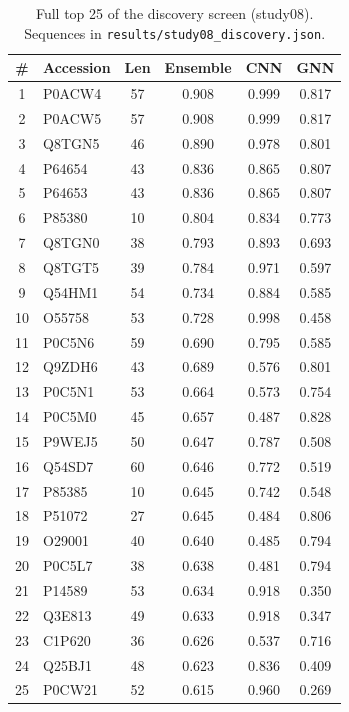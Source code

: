 \begin{table}[h]\centering\caption{Full top 25 of the discovery screen (study08). Sequences in \texttt{results/study08\_discovery.json}.}\label{tab:allscreen}
\small\begin{tabular}{clcccc}\hline \# & Accession & Len & Ensemble & CNN & GNN \\ \hline
1 & P0ACW4 & 57 & 0.908 & 0.999 & 0.817 \\
2 & P0ACW5 & 57 & 0.908 & 0.999 & 0.817 \\
3 & Q8TGN5 & 46 & 0.890 & 0.978 & 0.801 \\
4 & P64654 & 43 & 0.836 & 0.865 & 0.807 \\
5 & P64653 & 43 & 0.836 & 0.865 & 0.807 \\
6 & P85380 & 10 & 0.804 & 0.834 & 0.773 \\
7 & Q8TGN0 & 38 & 0.793 & 0.893 & 0.693 \\
8 & Q8TGT5 & 39 & 0.784 & 0.971 & 0.597 \\
9 & Q54HM1 & 54 & 0.734 & 0.884 & 0.585 \\
10 & O55758 & 53 & 0.728 & 0.998 & 0.458 \\
11 & P0C5N6 & 59 & 0.690 & 0.795 & 0.585 \\
12 & Q9ZDH6 & 43 & 0.689 & 0.576 & 0.801 \\
13 & P0C5N1 & 53 & 0.664 & 0.573 & 0.754 \\
14 & P0C5M0 & 45 & 0.657 & 0.487 & 0.828 \\
15 & P9WEJ5 & 50 & 0.647 & 0.787 & 0.508 \\
16 & Q54SD7 & 60 & 0.646 & 0.772 & 0.519 \\
17 & P85385 & 10 & 0.645 & 0.742 & 0.548 \\
18 & P51072 & 27 & 0.645 & 0.484 & 0.806 \\
19 & O29001 & 40 & 0.640 & 0.485 & 0.794 \\
20 & P0C5L7 & 38 & 0.638 & 0.481 & 0.794 \\
21 & P14589 & 53 & 0.634 & 0.918 & 0.350 \\
22 & Q3E813 & 49 & 0.633 & 0.918 & 0.347 \\
23 & C1P620 & 36 & 0.626 & 0.537 & 0.716 \\
24 & Q25BJ1 & 48 & 0.623 & 0.836 & 0.409 \\
25 & P0CW21 & 52 & 0.615 & 0.960 & 0.269 \\
\hline\end{tabular}\end{table}
